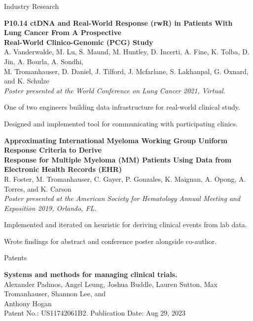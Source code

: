 \documentclass{resume} %
\begin{document}
\begin{grouping}{Industry Research}

\item {\bf P10.14 ctDNA and Real-World Response (rwR) in Patients With Lung Cancer From A Prospective} \\
    {\bf Real-World Clinico-Genomic (PCG) Study} \\
    A. Vanderwalde, M. Lu, S. Maund, M. Huntley, D. Incerti, A. Fine, K. Tolba, D. Jin, A.
    Bourla, A. Sondhi, \\
    M. Tromanhauser, D. Daniel, J. Tilford, J. Mcfarlane, S. Lakhanpal, G. Oxnard,
    and K. Schulze \\
    {\em Poster presented at the World Conference on Lung Cancer 2021, Virtual.}
    \begin{items}
        \item One of two engineers building data infrastructure for real-world clinical study.
        \item Designed and implemented tool for communicating with participating clinics.
    \end{items}

\item {\bf Approximating International Myeloma Working Group Uniform Response Criteria to Derive} \\
    {\bf Response for Multiple Myeloma (MM) Patients Using Data from Electronic Health
    Records (EHR)} \\
    R. Foster, M. Tromanhauser, C. Gayer, P. Gonzales, K. Maignan, A. Opong, A. Torres, and K. Carson \\
    {\em Poster presented at the American Society for Hematology Annual Meeting and Exposition
    2019, Orlando, FL.}
    \begin{items}
        \item Implemented and iterated on heuristic for deriving clinical events from lab data.
        \item Wrote findings for abstract and conference poster alongside co-author.
    \end{items}

\end{grouping}


\begin{grouping}{Patents}

\item {\bf Systems and methods for managing clinical trials.} \\
    Alexander Padmos, Angel Leung, Joshua Buddle, Lauren Sutton, Max Tromanhauser, Shannon
    Lee, and \\ Anthony Hogan \\
    {Patent No.: US11742061B2. Publication Date: Aug 29, 2023}

\end{grouping}
\end{document}
